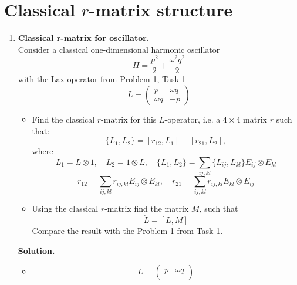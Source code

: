 \documentclass[12pt]{article}
\theoremstyle{definition}
\begin{document}
\section{Classical $r$-matrix structure}
\begin{enumerate}
    \item \textbf{Classical r-matrix for oscillator.}\\
    Consider a classical one-dimensional harmonic oscillator
    \begin{equation}
        H=\frac{p^2}{2}+\frac{\omega^2q^2}{2}
    \end{equation}
    with the Lax operator from Problem 1, Task 1
    \begin{equation}
        L=\begin{pmatrix}
            p & \omega q\\
            \omega q & -p
        \end{pmatrix}
    \end{equation}
    \begin{itemize}
        \item Find the classical $r$-matrix for this $L$-operator, i.e. a $4\times 4$ matrix $r$ such that:
        \begin{equation}
            \{L_1,L_2\}=[r_{12},L_1]-[r_{21},L_2],
        \end{equation}
        where
        \begin{equation}
            L_1=L\otimes1,\quad L_2=1\otimes L,\quad\{L_1,L_2\}=\sum\limits_{ij,kl}\{L_{ij},L_{kl}\}E_{ij}\otimes E_{kl}
        \end{equation}
        \begin{equation}
            r_{12}=\sum_{ij,kl}r_{ij,kl}E_{ij}\otimes E_{kl},\quad r_{21}=\sum\limits_{ij,kl}r_{ij,kl}E_{kl}\otimes E_{ij}
        \end{equation}
        \item Using the classical $r$-matrix find the matrix $M$, such that
        \begin{equation}
            \dot{L}=[L,M]
        \end{equation}
        Compare the result with the Problem 1 from Task 1.
    \end{itemize}
    \textbf{Solution.}
    \begin{itemize}
        \item 
        \begin{equation}
            L=\begin{pmatrix}
            p & \omega q\\

\end{pmatrix}
\end{equation}
\end{itemize}
\end{enumerate}
\end{document}
